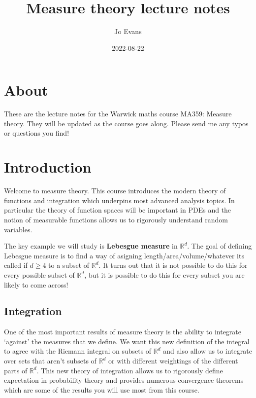 \documentclass[
]{book}
\title{Measure theory lecture notes}
\author{Jo Evans}
\date{2022-08-22}
\theoremstyle{definition}
\theoremstyle{definition}
\theoremstyle{definition}
\theoremstyle{definition}
\theoremstyle{remark}
\begin{document}
\maketitle

{
\setcounter{tocdepth}{1}
\tableofcontents
}
\hypertarget{about}{%
\chapter*{About}\label{about}}

These are the lecture notes for the Warwick maths course MA359: Measure theory. They will be updated as the course goes along. Please send me any typos or questions you find!

\hypertarget{introduction}{%
\chapter{Introduction}\label{introduction}}

Welcome to measure theory. This course introduces the modern theory of functions and integration which underpins most advanced analysis topics. In particular the theory of function spaces will be important in PDEs and the notion of measurable functions allows us to rigorously understand random variables.

The key example we will study is \textbf{Lebesgue measure} in \(\mathbb{R}^d\). The goal of defining Lebesgue measure is to find a way of asigning length/area/volume/whatever its called if \(d \geq 4\) to a subset of \(\mathbb{R}^d\). It turns out that it is not possible to do this for every possible subset of \(\mathbb{R}^d\), but it is possible to do this for every subset you are likely to come across!

\hypertarget{integration}{%
\section{Integration}\label{integration}}

One of the most important results of measure theory is the ability to integrate `against' the measures that we define. We want this new definition of the integral to agree with the Riemann integral on subsets of \(\mathbb{R}^d\) and also allow us to integrate over sets that aren't subsets of \(\mathbb{R}^d\) or with different weightings of the different parts of \(\mathbb{R}^d\). This new theory of integration allows us to rigorously define expectation in probability theory and provides numerous convergence theorems which are some of the results you will use most from this course.
\end{document}
